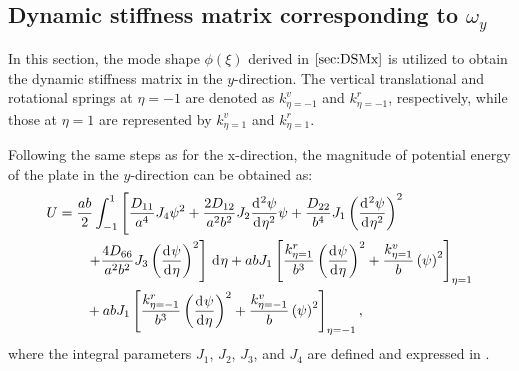 \documentclass[preprint,12pt]{elsarticle}
\newcommand{\id}{\mathrm{d}\mkern1mu}
\begin{document}
\subsection{Dynamic stiffness matrix corresponding to $\omega_y$}\label{sec:DSMy}
%
% 
In this section, the mode shape $\phi(\xi)$ derived in $\Cref{sec:DSMx}$ is utilized to obtain the dynamic stiffness matrix in the $y$-direction.  
The vertical translational and rotational springs at $\eta = -1$ are denoted as $k^v_{\eta = -1}$ and $k^r_{\eta = -1}$, respectively, while those at $\eta = 1$ are represented by $k^v_{\eta = 1}$ and $k^r_{\eta = 1}$.

Following the same steps as for the x-direction, the magnitude of potential energy of the plate in the $y$-direction can be obtained as:
%
\begin{equation}\label{eq:poten_energy_toly2}
	\begin{split}
		U
		&= \frac{ab}{2} \int_{-1}^{1} \left[ \frac{D_{11}}{a^4} J_4 \psi^2 
		+ \frac{2D_{12}}{a^2b^2} J_2 \frac{\id^2\psi }{\id \eta^2} \psi 
		+ \frac{D_{22}}{b^4} J_1 \left(\frac{\id^2\psi }{\id \eta^2} \right)^2 \right. \\
		&\qquad \left. + \frac{4D_{66}}{a^2b^2} J_3 \left(\frac{\id \psi }{\id \eta} \right)^2 \right] \, \id\eta  + abJ_1 \left[ \frac{k^r_{\eta=1}}{b^3} \left( \frac{\id \psi}{\id \eta} \right)^2
		+ \frac{k^v_{\eta=1}}{b}  \left(\psi\right)^2 \right]_{\eta=1} \\
		&\qquad + abJ_1 \left[ \frac{k^r_{\eta=-1}}{b^3} \left( \frac{\id \psi}{\id \eta} \right)^2
		+ \frac{k^v_{\eta=-1}}{b} \left(\psi\right)^2 \right]_{\eta=-1},
	\end{split}
\end{equation}
%
where the integral parameters $J_1$, $J_2$, $J_3$, and $J_4$ are defined and expressed in .
\end{document}
